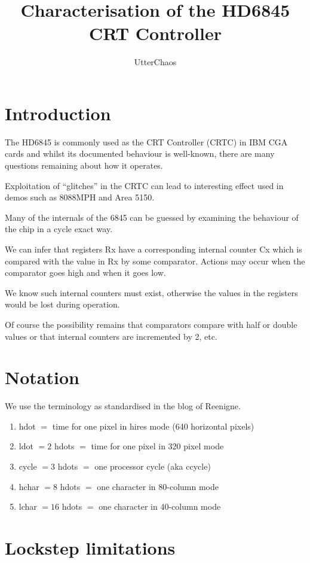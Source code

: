 \documentclass[a4paper,10pt]{amsart}
\title{Characterisation of the HD6845 CRT Controller}
\author{UtterChaos}
\begin{document}
\maketitle

\section{Introduction}

The HD6845 is commonly used as the CRT Controller (CRTC) in IBM CGA cards and
whilst its documented behaviour is well-known, there are many questions
remaining about how it operates.

Exploitation of ``glitches'' in the CRTC can lead to interesting effect used
in demos such as 8088MPH and Area 5150.

Many of the internals of the 6845 can be guessed by examining the behaviour of
the chip in a cycle exact way.

We can infer that registers Rx have a corresponding internal counter Cx which
is compared with the value in Rx by some comparator. Actions may occur when
the comparator goes high and when it goes low.

We know such internal counters must exist, otherwise the values in the
registers would be lost during operation.

Of course the possibility remains that comparators compare with half or
double values or that internal counters are incremented by 2, etc.

\section{Notation}

We use the terminology as standardised in the blog of Reenigne.

\begin{enumerate}
\item hdot $=$ time for one pixel in hires mode (640 horizontal pixels)
\item ldot $= 2$ hdots $=$ time for one pixel in 320 pixel mode 
\item cycle $= 3$ hdots $=$ one processor cycle (aka ccycle)
\item hchar $= 8$ hdots $=$ one character in 80-column mode
\item lchar $= 16$ hdots $=$ one character in 40-column mode
\end{enumerate}

\section{Lockstep limitations}
\end{document}
